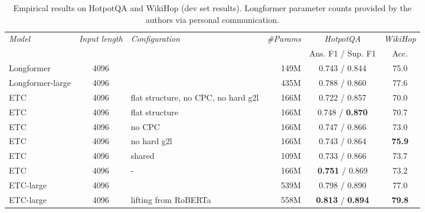\documentclass[11pt,a4paper]{article}
\begin{document}
\begin{table*}[tb]\centering 
\begin{small}
\begin{tabular}{lclr|cc} 
{\em Model} & {\em Input length} & {\em Configuration} & {\em \#Params} & {\em HotpotQA} & {\em WikiHop}\\ 
 &  &  & & Ans. F1 / Sup. F1 & Acc. \\ \hline
Longformer  & 4096  &  & 149M & 0.743 / 0.844 &  75.0  \\ 
Longformer-large  & 4096  &  & 435M &  0.788 / 0.860\footnotemark &  77.6  \\ \hline
ETC	        &   4096	& flat structure, no CPC, no hard g2l   & 166M & 0.722 / 0.857     & 70.0   \\
ETC	        &   4096	& flat structure                        & 166M & 0.748 / {\bf 0.870}     & 70.7     \\
ETC	        &   4096	& no CPC                                & 166M & 0.747 / 0.866     & 73.0    \\
ETC	        &   4096	& no hard g2l                           & 166M & 0.743 / 0.864     & {\bf 75.9}  \\
ETC	        &   4096	& shared                                & 109M & 0.733 / 0.866     & 73.7   \\
ETC	        &   4096    & -                                     & 166M & {\bf 0.751} / 0.869	  & 73.2     \\ \hline
ETC-large	&   4096    &                                      & 539M & 0.798 / 0.890	    & 77.0    \\
ETC-large	&   4096    & lifting from RoBERTa                  & 558M & {\bf 0.813} / {\bf 0.894}	    & {\bf 79.8}    \\
\end{tabular}		
\end{small}
\caption{Empirical results on HotpotQA and WikiHop (dev set results). Longformer parameter counts provided by the authors via personal communication.}
\label{tbl:results-hop} 
\end{table*}
\end{document}
